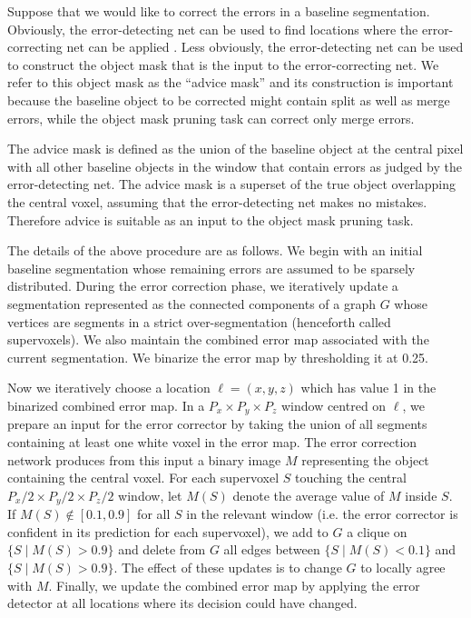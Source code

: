 \documentclass{article}
\begin{document}
Suppose that we would like to correct the errors in a baseline segmentation.
Obviously, the error-detecting net can be used to find locations where the
error-correcting net can be applied \cite{multipass}.  Less obviously, the
error-detecting net can be used to construct the object mask that is the input
to the error-correcting net. We refer to this object mask as the ``advice mask''
and its construction is important because the baseline object to be corrected
might contain split as well as merge errors, while the object mask pruning task
can correct only merge errors.

The advice mask is defined as the union of the baseline object at the central
pixel with all other baseline objects in the window that contain errors as
judged by the error-detecting net. The advice mask is a superset of the true
object overlapping the central voxel, assuming that the error-detecting net
makes no mistakes.  Therefore advice is suitable as an input to the object mask
pruning task.

The details of the above procedure are as follows. We begin with an initial baseline segmentation whose remaining errors are assumed to be sparsely distributed. During the error correction phase, we iteratively update a segmentation represented as the connected components of a graph $G$ whose vertices are segments in a strict over-segmentation (henceforth called supervoxels). We also maintain the combined error map associated with the current segmentation. We binarize the error map by thresholding it at 0.25.

Now we iteratively choose a location $\ell=(x,y,z)$ which has value 1 in the binarized combined error map. In a $P_x \times P_y \times P_z$ window centred on $\ell$, we prepare an input for the error corrector by taking the union of all segments containing at least one white voxel in the error map. The error correction network produces from this input a binary image $M$ representing the object containing the central voxel. For each supervoxel $S$ touching the central $P_x/2 \times P_y/2 \times P_z/2$ window, let $M(S)$ denote the average value of $M$ inside $S$. If $M(S) \not \in [0.1,0.9]$ for all $S$ in the relevant window (i.e. the error corrector is confident in its prediction for each supervoxel), we add to $G$ a clique on $\{S \mid M(S) > 0.9\}$ and delete from $G$ all edges between $\{S \mid M(S) < 0.1\}$ and $\{S \mid M(S) > 0.9\}$. The effect of these updates is to change $G$ to locally agree with $M$. Finally, we update the combined error map by applying the error detector at all locations where its decision could have changed.
\end{document}
